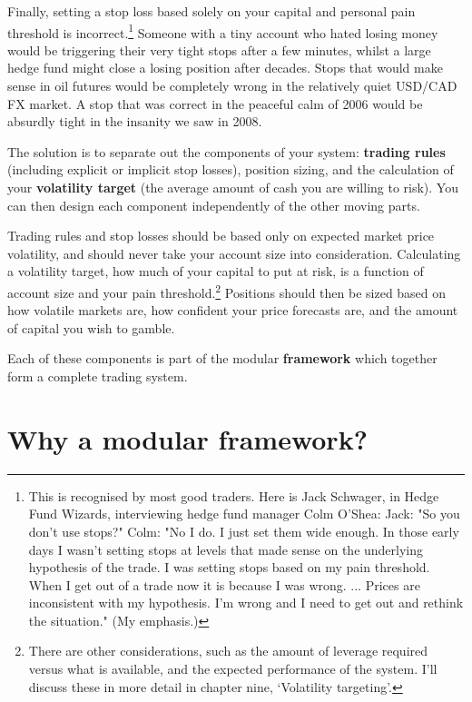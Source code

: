 Finally, setting a stop loss based solely on your capital and personal pain threshold is incorrect.\footnote{This is recognised by most good traders. Here is Jack Schwager, in Hedge Fund Wizards, interviewing hedge fund manager Colm O'Shea: Jack: "So you don't use stops?" Colm: "No I do. I just set them wide enough. In those early days I wasn't setting stops at levels that made sense on the underlying hypothesis of the trade. I was setting stops based on my pain threshold. When I get out of a trade now it is because I was wrong. ... Prices are inconsistent with my hypothesis. I'm wrong and I need to get out and rethink the situation." (My emphasis.)} Someone with a tiny account who hated losing money would be triggering their very tight stops after a few minutes, whilst a large hedge fund might close a losing position after decades. Stops that would make sense in oil futures would be completely wrong in the relatively quiet USD/CAD FX market. A stop that was correct in the peaceful calm of 2006 would be absurdly tight in the insanity we saw in 2008. 

The solution is to separate out the components of your system: \textbf{trading rules} (including explicit or implicit stop losses), position sizing, and the calculation of your \textbf{volatility target} (the average amount of cash you are willing to risk). You can then design each component independently of the other moving parts. 

Trading rules and stop losses should be based only on expected market price volatility, and should never take your account size into consideration. Calculating a volatility target, how much of your capital to put at risk, is a function of account size and your pain threshold.\footnote{There are other considerations, such as the amount of leverage required versus what is available, and the expected performance of the system. I'll discuss these in more detail in chapter nine, ‘Volatility targeting'.} Positions should then be sized based on how volatile markets are, how confident your price forecasts are, and the amount of capital you wish to gamble. 

Each of these components is part of the modular \textbf{framework} which together form a complete trading system.

\section*{Why a modular framework?}  {}

